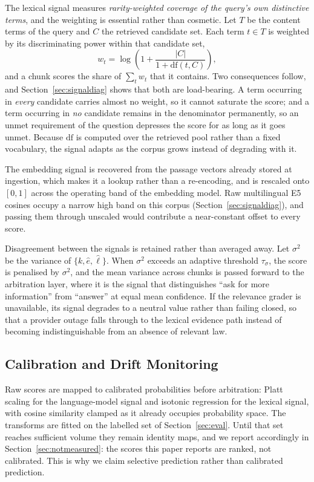 \documentclass[conference]{IEEEtran}
\begin{document}
The lexical signal measures \emph{rarity-weighted coverage of the query's own
distinctive terms}, and the weighting is essential rather than cosmetic. Let
$T$ be the content terms of the query and $C$ the retrieved candidate set. Each
term $t\in T$ is weighted by its discriminating power within that candidate set,
\begin{equation}
w_t = \log\!\left(1 + \frac{|C|}{1 + \mathrm{df}(t, C)}\right),
\label{eq:localidf}
\end{equation}
and a chunk scores the share of $\sum_t w_t$ that it contains. Two consequences
follow, and Section~\ref{sec:signaldiag} shows that both are load-bearing. A
term occurring in \emph{every} candidate carries almost no weight, so it cannot
saturate the score; and a term occurring in \emph{no} candidate remains in the
denominator permanently, so an unmet requirement of the question depresses the
score for as long as it goes unmet. Because $\mathrm{df}$ is computed over the
retrieved pool rather than a fixed vocabulary, the signal adapts as the corpus
grows instead of degrading with it.

The embedding signal is recovered from the passage vectors already stored at
ingestion, which makes it a lookup rather than a re-encoding, and is rescaled
onto $[0,1]$ across the operating band of the embedding model. Raw multilingual
E5 cosines occupy a narrow high band on this corpus (Section~\ref{sec:signaldiag}),
and passing them through unscaled would contribute a near-constant offset to
every score.

Disagreement between the signals is retained rather than averaged away. Let
$\sigma^2$ be the variance of $\{k,\hat{e},\hat{\ell}\}$. When $\sigma^2$
exceeds an adaptive threshold $\tau_\sigma$, the score is penalised by
$\sigma^2$, and the mean variance across chunks is passed forward to the
arbitration layer, where it is the signal that distinguishes ``ask for more
information'' from ``answer'' at equal mean confidence. If the relevance grader
is unavailable, its signal degrades to a neutral value rather than failing
closed, so that a provider outage falls through to the lexical evidence path
instead of becoming indistinguishable from an absence of relevant law.

\subsection{Calibration and Drift Monitoring}
\label{sec:calib}
Raw scores are mapped to calibrated probabilities before arbitration: Platt
scaling for the language-model signal and isotonic regression for the lexical
signal, with cosine similarity clamped as it already occupies probability space.
The transforms are fitted on the labelled set of Section~\ref{sec:eval}. Until
that set reaches sufficient volume they remain identity maps, and we report
accordingly in Section~\ref{sec:notmeasured}: the scores this paper reports are
ranked, not calibrated. This is why we claim selective prediction rather than
calibrated prediction.
\end{document}
